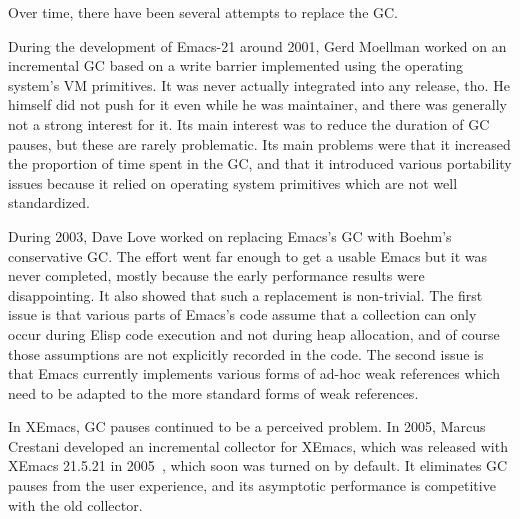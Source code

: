 \documentclass[format=acmsmall, review=false, screen=true]{acmart}
\newcommand \Elisp {Elisp}
\begin{document}
Over time, there have been several attempts to replace the GC.

During the development of Emacs-21 around 2001, Gerd Moellman worked on an incremental
GC based on a write barrier implemented using the operating system's VM
primitives.  It was never actually integrated into any release, tho.
He himself did not push for it even while he was maintainer, and there was
generally not a strong interest for it.  Its main interest was to reduce the
duration of GC pauses, but these are rarely problematic.  Its main problems
were that it increased the proportion of time spent in the GC, and that it
introduced various portability issues because it relied on operating system
primitives which are not well standardized.

During 2003, Dave Love worked on replacing Emacs's GC with Boehm's
conservative GC.  The effort went far enough to get a usable Emacs but it
was never completed, mostly because the early performance results were
disappointing.  It also showed that such a replacement is non-trivial.
The first issue is that various parts of Emacs's code assume that
a collection can only occur during \Elisp{} code execution and not during
heap allocation, and of course those assumptions are not explicitly recorded
in the code.  The second issue is that Emacs currently implements various
forms of ad-hoc weak references which need to be adapted to the more
standard forms of weak references.

\label{sec:incremental-gc}
In XEmacs, GC pauses continued to be a perceived problem.
In 2005, Marcus Crestani developed an incremental collector for
XEmacs, which was released with XEmacs 21.5.21 in
2005~\cite{Crestani2005}, which soon was turned on by default.  It
eliminates GC pauses from the user experience, and its asymptotic
performance is competitive with the old collector.

\end{document}

